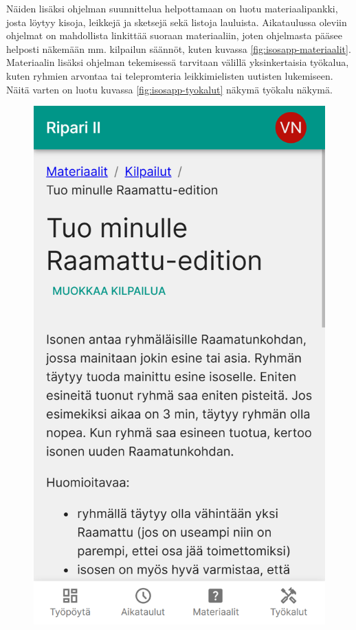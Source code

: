 Näiden lisäksi ohjelman suunnittelua helpottamaan on luotu materiaalipankki,
josta löytyy kisoja, leikkejä ja sketsejä sekä listoja lauluista. Aikataulussa
oleviin ohjelmat on mahdollista linkittää suoraan materiaaliin, joten
ohjelmasta pääsee helposti näkemään mm. kilpailun säännöt, kuten kuvassa
\ref{fig:isosapp-materiaalit}. Materiaalin lisäksi ohjelman tekemisessä
tarvitaan välillä yksinkertaisia työkalua, kuten ryhmien arvontaa tai
telepromteria leikkimielisten uutisten lukemiseen. Näitä varten on luotu
kuvassa \ref{fig:isosapp-tyokalut} näkymä työkalu näkymä.

\begin{figure}[h!]
    \centering
    \begin{minipage}[b]{.3\textwidth}
        \includegraphics[width=\textwidth]{figures/isosapp-materiaalit.png}

\end{minipage}
\end{figure}
